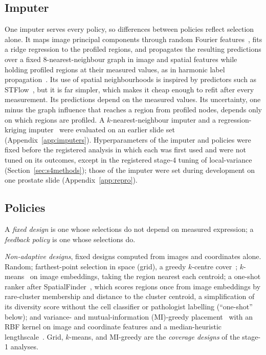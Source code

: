 \documentclass[10pt]{article}
\begin{document}
\subsection{Imputer}
One imputer serves every policy, so differences between policies reflect selection alone. It maps image principal
components through random Fourier features~\citep{rahimi2007random}, fits a ridge regression to the profiled
regions, and propagates the resulting predictions over a fixed 8-nearest-neighbour graph in image and spatial
features while holding profiled regions at their measured values, as in harmonic label
propagation~\citep{zhu2003semi}. Its use of spatial neighbourhoods is inspired by predictors such as
STFlow~\citep{huang2025stflow}, but it is far simpler, which makes it cheap enough to refit after every
measurement. Its predictions depend on the
measured values. Its uncertainty, one minus the graph influence that reaches a region from profiled nodes, depends
only on which regions are profiled. A $k$-nearest-neighbour imputer and a regression-kriging
imputer~\citep{hengl2007regression} were evaluated on an earlier slide set (Appendix~\ref{app:imputers}).
Hyperparameters of the imputer and policies were fixed before the registered analysis in which each was first
used and were not tuned on its outcomes, except in the registered stage-4 tuning of local-variance
(Section~\ref{sec:s4methods}); those of the imputer were set during development on one prostate slide
(Appendix~\ref{app:repro}).

\subsection{Policies}
A \emph{fixed design} is one whose selections do not depend on measured expression; a \emph{feedback policy} is one
whose selections do.

\emph{Non-adaptive designs}, fixed designs computed from images and coordinates alone. Random; farthest-point selection in space (grid), a greedy $k$-centre
cover~\citep{gonzalez1985clustering}; $k$-means~\citep{lloyd1982least} on image embeddings, taking the region
nearest each centroid; a one-shot ranker after SpatialFinder~\citep{spatialfinder2026}, which scores regions once
from image embeddings by rare-cluster membership and distance to the cluster centroid, a simplification of its
diversity score without the cell classifier or pathologist labelling (``one-shot'' below); and variance- and
mutual-information (MI)-greedy placement~\citep{krause2008near} with an RBF kernel on image and coordinate
features and a median-heuristic lengthscale~\citep{garreau2017large}. Grid, $k$-means, and MI-greedy are the
\emph{coverage designs} of the stage-1 analyses.
\end{document}
